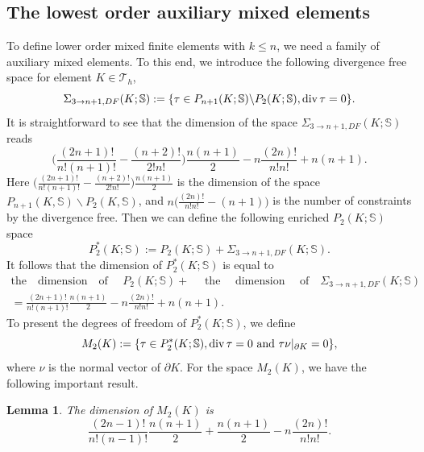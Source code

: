 \documentclass{amsart}
\newtheorem{lemma}{Lemma}[section]
\numberwithin{table}{section}
\numberwithin{figure}{section}
\begin{document}
\subsection{The lowest order auxiliary mixed  elements}
To define  lower order  mixed finite elements with $k\leq n$, we need a family of auxiliary mixed  elements.  To this end,
 we  introduce the following divergence free space for element $K\in \mathcal{T}_h$,
 \begin{equation}
 \Sigma_{3\rightarrow n+1, DF}(K; \mathbb{S}):=\{\tau\in P_{n+1}(K; \mathbb{S})\backslash P_2(K; \mathbb{S}), \operatorname{div} \tau=0 \}.
 \end{equation}
 It is straightforward to see that the dimension of the space $\Sigma_{3\rightarrow n+1, DF}(K; \mathbb{S})$ reads
 \begin{equation}
\bigg( \frac{(2n+1)!}{n!(n+1)!}-\frac{(n+2)!}{2!n!}\bigg)\frac{n(n+1)}{2}-n\frac{(2n)!}{n!n!}+n(n+1).
 \end{equation}
 Here $\bigg( \frac{(2n+1)!}{n!(n+1)!}-\frac{(n+2)!}{2!n!}\bigg)\frac{n(n+1)}{2}$ is the dimension of the space $P_{n+1}(K,\mathbb{S})\backslash P_2(K, \mathbb{S})$, and $n\bigg(\frac{(2n)!}{n!n!}-(n+1)\bigg)$ is the number of constraints
  by the divergence free. Then we can define the following enriched $P_2(K;  \mathbb{S})$ space
  \begin{equation}
  P_2^\ast(K; \mathbb{S}):=P_2(K; \mathbb{S})+\Sigma_{3\rightarrow n+1, DF}(K; \mathbb{S}).
  \end{equation}
   It follows that the dimension of $P_2^\ast(K; \mathbb{S})$ is equal to
   \begin{equation}\label{eq3.4}
   \begin{split}
    \text{the~~ dimension~~ of ~~~}P_2(K; \mathbb{S})+ \text{~~~ the~~~ dimension~~~ of~~ }\Sigma_{3\rightarrow n+1, DF}(K;  \mathbb{S})\\
    = \frac{(2n+1)!}{n!(n+1)!}\frac{n(n+1)}{2}-n\frac{(2n)!}{n!n!}+n(n+1).
   \end{split}
   \end{equation}
  To  present the degrees of freedom of  $P_2^\ast(K; \mathbb{S})$, we define
  \begin{equation}
    M_2(K):=\{\tau\in P_2^\ast(K;  \mathbb{S}), \operatorname{div}\tau=0 \text{ and }\tau\nu|_{\partial K}=0 \},
  \end{equation}
  where $\nu$ is the   normal vector of $\partial K$. For the space $M_2(K)$, we have the following important result.
  \begin{lemma} The dimension of $M_2(K)$ is
  \begin{equation}
  \frac{(2n-1)!}{n!(n-1)!}\frac{n(n+1)}{2}+\frac{n(n+1)}{2}-n\frac{(2n)!}{n!n!}.
  \end{equation}
  \end{lemma}
\end{document}

